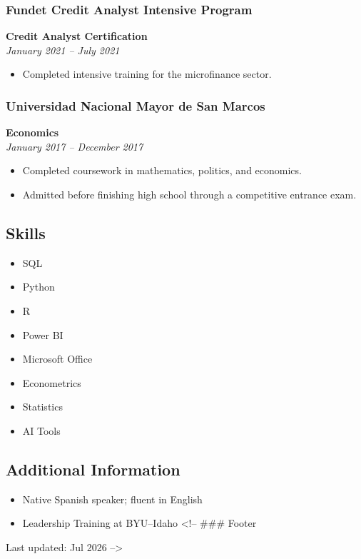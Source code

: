 \documentclass[
  letterpaper,
  DIV=11,
  numbers=noendperiod]{scrartcl}
\providecommand{\tightlist}{%
  \setlength{\itemsep}{0pt}\setlength{\parskip}{0pt}}
\begin{document}
\subsubsection{Fundet Credit Analyst Intensive
Program}\label{fundet-credit-analyst-intensive-program}

\textbf{Credit Analyst Certification}\\
\emph{January 2021 -- July 2021}

\begin{itemize}
\tightlist
\item
  Completed intensive training for the microfinance sector.
\end{itemize}

\subsubsection{Universidad Nacional Mayor de San
Marcos}\label{universidad-nacional-mayor-de-san-marcos}

\textbf{Economics}\\
\emph{January 2017 -- December 2017}

\begin{itemize}
\tightlist
\item
  Completed coursework in mathematics, politics, and economics.
\item
  Admitted before finishing high school through a competitive entrance
  exam.
\end{itemize}

\subsection{Skills}\label{skills}

\begin{itemize}
\tightlist
\item
  SQL
\item
  Python
\item
  R
\item
  Power BI
\item
  Microsoft Office
\item
  Econometrics
\item
  Statistics
\item
  AI Tools
\end{itemize}

\subsection{Additional Information}\label{additional-information}

\begin{itemize}
\tightlist
\item
  Native Spanish speaker; fluent in English
\item
  Leadership Training at BYU--Idaho \textless!-- \#\#\# Footer
\end{itemize}

Last updated: Jul 2026 --\textgreater{}
\end{document}
